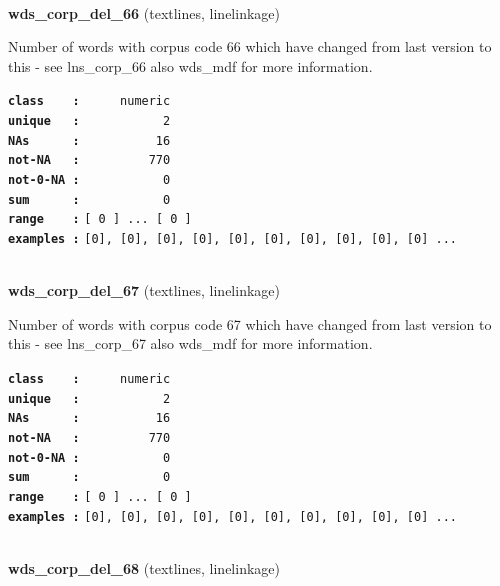 \documentclass[]{article}
\begin{document}
~

\textbf{wds\_corp\_del\_66} (textlines, linelinkage)

Number of words with corpus code 66 which have changed from last version
to this - see lns\_corp\_66 also wds\_mdf for more information.

\textbf{\texttt{class\ \ \ \ :}} \texttt{~~~~~numeric}\\
\textbf{\texttt{unique\ \ \ :}} \texttt{~~~~~~~~~~~2}\\
\textbf{\texttt{NAs\ \ \ \ \ \ :}} \texttt{~~~~~~~~~~16}\\
\textbf{\texttt{not-NA\ \ \ :}} \texttt{~~~~~~~~~770}\\
\textbf{\texttt{not-0-NA\ :}} \texttt{~~~~~~~~~~~0}\\
\textbf{\texttt{sum\ \ \ \ \ \ :}} \texttt{~~~~~~~~~~~0}\\
\textbf{\texttt{range\ \ \ \ :}}
\texttt{{[}\ 0\ {]}\ ...\ {[}\ 0\ {]}}\\
\textbf{\texttt{examples\ :}}
\texttt{{[}0{]},\ {[}0{]},\ {[}0{]},\ {[}0{]},\ {[}0{]},\ {[}0{]},\ {[}0{]},\ {[}0{]},\ {[}0{]},\ {[}0{]}\ ...}\\

~

\textbf{wds\_corp\_del\_67} (textlines, linelinkage)

Number of words with corpus code 67 which have changed from last version
to this - see lns\_corp\_67 also wds\_mdf for more information.

\textbf{\texttt{class\ \ \ \ :}} \texttt{~~~~~numeric}\\
\textbf{\texttt{unique\ \ \ :}} \texttt{~~~~~~~~~~~2}\\
\textbf{\texttt{NAs\ \ \ \ \ \ :}} \texttt{~~~~~~~~~~16}\\
\textbf{\texttt{not-NA\ \ \ :}} \texttt{~~~~~~~~~770}\\
\textbf{\texttt{not-0-NA\ :}} \texttt{~~~~~~~~~~~0}\\
\textbf{\texttt{sum\ \ \ \ \ \ :}} \texttt{~~~~~~~~~~~0}\\
\textbf{\texttt{range\ \ \ \ :}}
\texttt{{[}\ 0\ {]}\ ...\ {[}\ 0\ {]}}\\
\textbf{\texttt{examples\ :}}
\texttt{{[}0{]},\ {[}0{]},\ {[}0{]},\ {[}0{]},\ {[}0{]},\ {[}0{]},\ {[}0{]},\ {[}0{]},\ {[}0{]},\ {[}0{]}\ ...}\\

~

\textbf{wds\_corp\_del\_68} (textlines, linelinkage)
\end{document}
